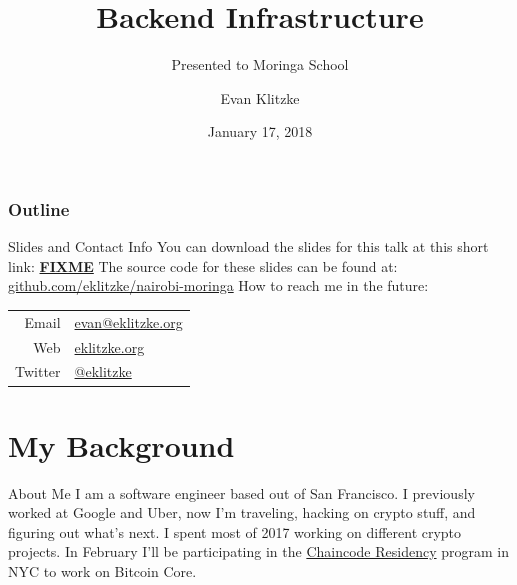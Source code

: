 \documentclass[14pt]{beamer}
\title{Backend Infrastructure}
\subtitle{Presented to Moringa School}
\author{Evan Klitzke}
\date{January 17, 2018}
\begin{document}
\begin{frame}
  \titlepage
\end{frame}


\begin{frame}
\frametitle{Outline}
  \tableofcontents
\end{frame}

\begin{frame}{Slides and Contact Info}
  You can download the slides for this talk at this short link:
  \textbf{\href{hFIXME}{FIXME}}
  \newline
  \newline
  The source code for these slides can be found at:
  \href{https://github.com/eklitzke/nairobi-moringa}{github.com/eklitzke/nairobi-moringa}
  \newline
  \newline
  How to reach me in the future:
  \newline
  \newline
  \begin{tabular}{r | l}
    Email & \href{mailto:evan@eklitzke.org}{evan@eklitzke.org} \\
    Web & \href{https://eklitzke.org}{eklitzke.org} \\
    Twitter & \href{https://twitter.com/eklitzke}{@eklitzke} \\
  \end{tabular}
\end{frame}

\section{My Background}

\begin{frame}{About Me}
  I am a software engineer based out of San Francisco. I previously worked at
  Google and Uber, now I'm traveling, hacking on crypto stuff, and figuring out
  what's next.
  \newline
  \newline
  I spent most of 2017 working on different crypto projects. In February I'll be
  participating in the \href{https://hackerresidency.com}{Chaincode Residency}
  program in NYC to work on Bitcoin Core.
\end{frame}
\end{document}
